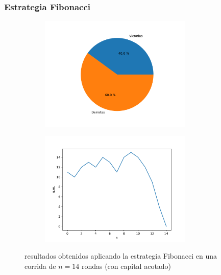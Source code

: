 \documentclass{article}
\begin{document}
  \subsubsection{Estrategia Fibonacci}
  \begin{figure}[H]
    \centering
    \begin{subfigure}{0.5\textwidth}
      \centering
      \includegraphics[width=0.8\textwidth]{generated/porcentajes-fibonacci-acotado.pdf}
    \end{subfigure}%
    \begin{subfigure}{0.5\textwidth}
      \centering
      \includegraphics[width=0.8\textwidth]{generated/capital-fibonacci-acotado.pdf}
    \end{subfigure}
    \caption{resultados obtenidos aplicando la estrategia Fibonacci en una corrida de $n = 14$ rondas (con capital acotado)}
  \end{figure}
\end{document}
